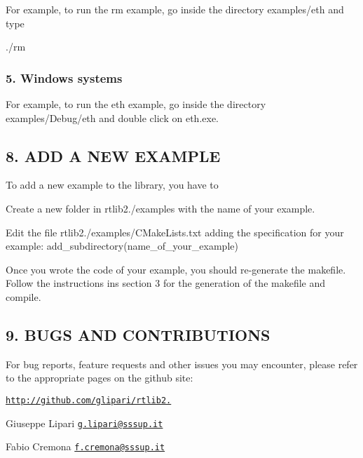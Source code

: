 For example, to run the rm example, go inside the directory examples/eth and type

./rm

\subsubsection*{5. Windows systems}

For example, to run the eth example, go inside the directory examples/\+Debug/eth and double click on eth.\+exe.

\subsection*{8. A\+DD A N\+EW E\+X\+A\+M\+P\+LE}

To add a new example to the library, you have to


\begin{DoxyItemize}
\item Create a new folder in rtlib2./examples with the name of your example.
\item Edit the file rtlib2./examples/\+C\+Make\+Lists.txt adding the specification for your example\+: add\+\_\+subdirectory(name\+\_\+of\+\_\+your\+\_\+example)
\end{DoxyItemize}

Once you wrote the code of your example, you should re-\/generate the makefile. Follow the instructions ins section 3 for the generation of the makefile and compile.

\subsection*{9. B\+U\+GS A\+ND C\+O\+N\+T\+R\+I\+B\+U\+T\+I\+O\+NS}

For bug reports, feature requests and other issues you may encounter, please refer to the appropriate pages on the github site\+:

\href{http://github.com/glipari/rtlib2.0}{\tt http\+://github.\+com/glipari/rtlib2.}

Giuseppe Lipari \href{mailto:g.lipari@sssup.it}{\tt g.\+lipari@sssup.\+it}

Fabio Cremona \href{mailto:f.cremona@sssup.it}{\tt f.\+cremona@sssup.\+it} 